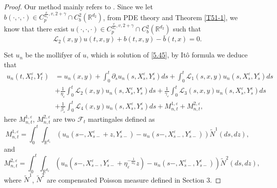 \documentclass[11pt,reqno]{amsart}
\numberwithin{equation}{section}
\begin{document}
\begin{proof}
Our method mainly refers to \cite[Lemma 4.2]{RX}.
Since we let $b(\cdot,\cdot,\cdot)\in C_{p}^{\frac{v}{\alpha_{1}},v, 2+\gamma}\cap C_{b}^{2}(\mathbb{R}^{d_{2}})$, from PDE theory and Theorem \ref{T51-1}, we know that there exist  $ u(\cdot,\cdot,\cdot)\in C_{p}^{\frac{v}{\alpha_{1}},v, 2+\gamma}\cap C_{b}^{2}(\mathbb{R}^{d_{2}})$ such that
\begin{equation}\label{5.45}
	\mathcal{L}_{2}(x,y)u(t,x,y)+b(t,x,y)-\bar{b}(t,x)=0.
\end{equation}



Set $u_{n}$ be the mollifyer of $u$, which is solution of \eqref{5.45}, by It\^{o} formula we deduce that
\begin{equation}\label{5.46}
	\begin{split}
		u_{n}(t,X_{t}^{\varepsilon},Y_{t}^{\varepsilon})
	&=u_{n}(x,y)+\int_{0}^{t}\partial_{s}u_{n}(s,X_{s}^{\varepsilon},Y_{s}^{\varepsilon})ds+\int_{0}^{t}\mathcal{L}_{1}(s,x,y)u_{n}(s,X_{s}^{\varepsilon},Y_{s}^{\varepsilon})ds\\
	&+\frac{1}{\eta_{\varepsilon}}\int_{0}^{t}\mathcal{L}_{2}(x,y)u_{n}(s,X_{s}^{\varepsilon},Y_{s}^{\varepsilon})ds+\frac{1}{\gamma_{\varepsilon}}\int_{0}^{t}\mathcal{L}_{3}(s,x,y)u_{n}(s,X_{s}^{\varepsilon},Y_{s}^{\varepsilon})ds\\
	&+\frac{1}{\beta_{\varepsilon}}\int_{0}^{t}\mathcal{L}_{4}(x,y)u_{n}(s,X_{s}^{\varepsilon},Y_{s}^{\varepsilon})ds+M_{n,t}^{1,\varepsilon}+M_{n,t}^{2,\varepsilon},
	\end{split}
\end{equation}
here $M_{n,t}^{1,\varepsilon}$, $M_{n,t}^{2,\varepsilon}$ are two $ \mathcal{F}_{t}$ martingales defined as
\begin{equation}\label{5.46-1} M_{n,t}^{1,\varepsilon}=\int_{0}^{t}\int_{\mathbb{R}^{d_{1}}}(u_{n}(s-,X_{s-}^{\varepsilon}+z,Y_{s-}^{\varepsilon})-u_{n}(s-,X_{s-}^{\varepsilon},Y_{s-}^{\varepsilon}))\tilde{N}^{1}(ds,dz),
\end{equation}
and
\begin{equation}\label{5.46-2} M_{n,t}^{2,\varepsilon}=\int_{0}^{t}\int_{\mathbb{R}^{d_{2}}}(u_{n}(s-,X_{s-}^{\varepsilon},Y_{s-}^{\varepsilon}+\eta_{\varepsilon}^{-\frac{1}{\alpha_{2}}}z)-u_{n}(s-,X_{s-}^{\varepsilon},Y_{s-}^{\varepsilon}))\tilde{N}^{2}(ds,dz),
\end{equation}
where $\tilde{N}^{1}$, $\tilde{N}^{2}$ are compensated Poisson measure defined in Section 3.


\end{proof}
\end{document}

